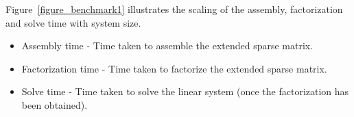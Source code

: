\documentclass[final,leqno]{siamltex}
\begin{document}
Figure~\ref{figure_benchmark1} illustrates the scaling of the assembly, factorization and solve time with system size.
\begin{itemize}
\item
Assembly time - Time taken to assemble the extended sparse matrix.
\item
Factorization time - Time taken to factorize the extended sparse matrix.
\item
Solve time - Time taken to solve the linear system (once the factorization has been obtained).
\end{itemize}

\begin{figure}[!htbp]
\end{figure}
\end{document}
